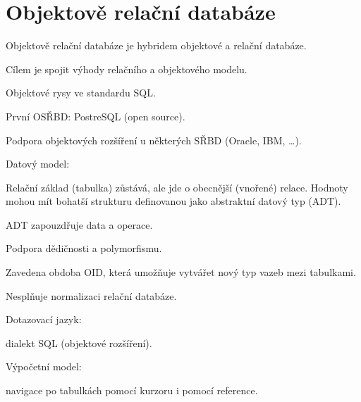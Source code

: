
\section{Objektově relační databáze}

\begin{compactitem}
    \item Objektově relační databáze je hybridem objektové a relační databáze. \begin{compactitem}
        \item Cílem je spojit výhody relačního a objektového modelu.
    \end{compactitem}

    \item Objektové rysy ve standardu SQL.
    \item První OSŘBD: PostreSQL (open source).
    \item Podpora objektových rozšíření u některých SŘBD (Oracle, IBM, \dots).

    \item Datový model: \begin{compactitem}
        \item Relační základ (tabulka) zůstává, ale jde o obecnější (vnořené) relace. Hodnoty mohou mít bohatší strukturu definovanou jako abstraktní datový typ (ADT).
        \item ADT zapouzdřuje data a operace.
        \item Podpora dědičnosti a polymorfismu.
        \item Zavedena obdoba OID, která umožňuje vytvářet nový typ vazeb mezi tabulkami.
        \item Nesplňuje normalizaci relační databáze.
    \end{compactitem}

    \item Dotazovací jazyk: \begin{compactitem}
        \item dialekt SQL (objektové rozšíření).
    \end{compactitem}

    \item Výpočetní model: \begin{compactitem}
        \item navigace po tabulkách pomocí kurzoru i pomocí reference.
    \end{compactitem}


\end{compactitem}
